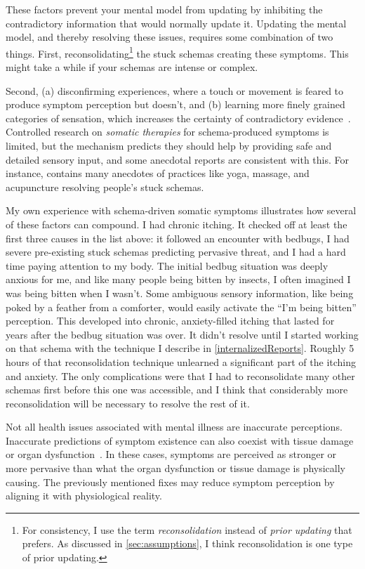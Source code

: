 \documentclass[11pt,oneside]{book}
\let\cite\parencite
\begin{document}
These factors prevent your mental model from updating by inhibiting the contradictory information that would normally update it. Updating the mental model, and thereby resolving these issues, requires some combination of two things. First, reconsolidating\footnote{For consistency, I use the term \textit{reconsolidation} instead of \textit{prior updating} that \textcite{berghPsychogenic} prefers. As discussed in \cref{sec:assumptions}, I think reconsolidation is one type of prior updating.} the stuck schemas creating these symptoms. This might take a while if your schemas are intense or complex.

Second, (a) disconfirming experiences, where a touch or movement is feared to produce symptom perception but doesn't, and (b) learning more finely grained categories of sensation, which increases the certainty of contradictory evidence~\cite{berghPsychogenic}. Controlled research on \textit{somatic therapies} for schema-produced symptoms is limited, but the mechanism predicts they should help by providing safe and detailed sensory input, and some anecdotal reports are consistent with this. For instance, \textcite{vanderKolkBody} contains many anecdotes of practices like yoga, massage, and acupuncture resolving people's stuck schemas.

My own experience with schema-driven somatic symptoms illustrates how several of these factors can compound. I had chronic itching. It checked off at least the first three causes in the list above: it followed an encounter with bedbugs, I had severe pre-existing stuck schemas predicting pervasive threat, and I had a hard time paying attention to my body. The initial bedbug situation was deeply anxious for me, and like many people being bitten by insects, I often imagined I was being bitten when I wasn't. Some ambiguous sensory information, like being poked by a feather from a comforter, would easily activate the \enquote{I'm being bitten} perception. This developed into chronic, anxiety-filled itching that lasted for years after the bedbug situation was over. It didn't resolve until I started working on that schema with the technique I describe in \cref{internalizedReports}. Roughly 5 hours of that reconsolidation technique unlearned a significant part of the itching and anxiety. The only complications were that I had to reconsolidate many other schemas first before this one was accessible, and I think that considerably more reconsolidation will be necessary to resolve the rest of it.

Not all health issues associated with mental illness are inaccurate perceptions. Inaccurate predictions of symptom existence can also coexist with tissue damage or organ dysfunction~\cite{berghPsychogenic}. In these cases, symptoms are perceived as stronger or more pervasive than what the organ dysfunction or tissue damage is physically causing. The previously mentioned fixes may reduce symptom perception by aligning it with physiological reality.
\end{document}
